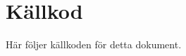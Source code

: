 \chapter{Källkod}
\label{ch:source}
\noindent
Här följer källkoden för detta dokument.













